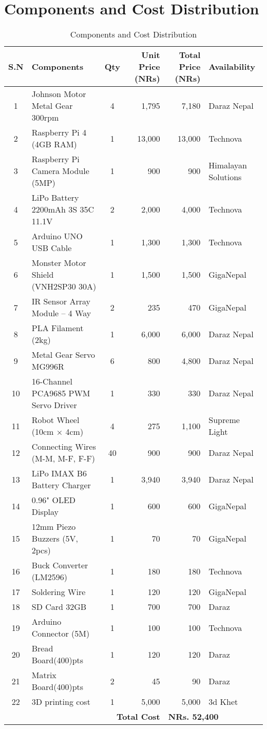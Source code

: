 \section*{Components and Cost Distribution}

\begin{table}[h]
\centering
\small  %
\renewcommand{\arraystretch}{1.05}  %
\begin{tabular}{|c|p{4.6cm}|c|r|r|p{3cm}|}
\hline
\textbf{S.N} & \textbf{Components} & \textbf{Qty} & \textbf{Unit Price (NRs)} & \textbf{Total Price (NRs)} & \textbf{Availability} \\
\hline
1  & Johnson Motor Metal Gear 300rpm & 4 & 1,795 & 7,180 & Daraz Nepal \\\hline
2  & Raspberry Pi 4 (4GB RAM) & 1 & 13,000 & 13,000 & Technova \\\hline
3  & Raspberry Pi Camera Module (5MP) & 1 & 900 & 900 & Himalayan Solutions \\\hline
4  & LiPo Battery 2200mAh 3S 35C 11.1V & 2 & 2,000 & 4,000 & Technova \\\hline
5  & Arduino UNO USB Cable & 1 & 1,300 & 1,300 & Technova \\\hline
6  & Monster Motor Shield (VNH2SP30 30A) & 1 & 1,500 & 1,500 & GigaNepal \\\hline
7  & IR Sensor Array Module – 4 Way & 2 & 235 & 470 & GigaNepal \\\hline
8  & PLA Filament (2kg) & 1 & 6,000 & 6,000 & Daraz Nepal \\\hline
9  & Metal Gear Servo MG996R & 6 & 800 & 4,800 & Daraz Nepal \\\hline
10 & 16-Channel PCA9685 PWM Servo Driver & 1 & 330 & 330 & Daraz Nepal \\\hline
11 & Robot Wheel (10cm × 4cm) & 4 & 275 & 1,100 & Supreme Light \\\hline
12 & Connecting Wires (M-M, M-F, F-F) & 40 & 900 & 900 & Daraz Nepal \\\hline
13 & LiPo IMAX B6 Battery Charger & 1 & 3,940 & 3,940 & Daraz Nepal \\\hline
14 & 0.96" OLED Display & 1 & 600 & 600 & GigaNepal \\\hline
15 & 12mm Piezo Buzzers (5V, 2pcs) & 1 & 70 & 70 & GigaNepal \\\hline
16 & Buck Converter (LM2596) & 1 & 180 & 180 & Technova \\\hline
17 & Soldering Wire & 1 & 120 & 120 & GigaNepal \\\hline
18 & SD Card 32GB & 1 & 700 & 700 & Daraz \\\hline
19 & Arduino Connector (5M) & 1 & 100 & 100 & Technova \\
\hline
20 & Bread Board(400)pts & 1 & 120 & 120 & Daraz \\
\hline
21 & Matrix Board(400)pts & 2 & 45  & 90 & Daraz \\
\hline
22 & 3D printing cost & 1 & 5,000  & 5,000 & 3d Khet \\
\hline
\multicolumn{4}{|r|}{\textbf{Total Cost}} & \multicolumn{2}{l|}{\textbf{NRs. 52,400}} \\
\hline
\end{tabular}
\caption{Components and Cost Distribution}
\end{table}
